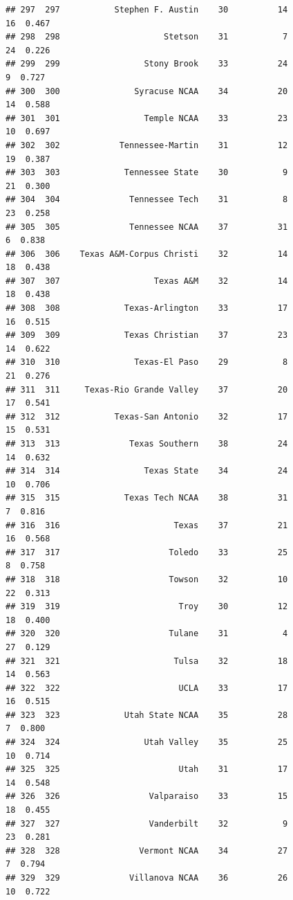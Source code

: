 \documentclass[]{book}
\begin{document}
\begin{verbatim}
## 297  297           Stephen F. Austin    30          14            16  0.467
## 298  298                     Stetson    31           7            24  0.226
## 299  299                 Stony Brook    33          24             9  0.727
## 300  300               Syracuse NCAA    34          20            14  0.588
## 301  301                 Temple NCAA    33          23            10  0.697
## 302  302            Tennessee-Martin    31          12            19  0.387
## 303  303             Tennessee State    30           9            21  0.300
## 304  304              Tennessee Tech    31           8            23  0.258
## 305  305              Tennessee NCAA    37          31             6  0.838
## 306  306    Texas A&M-Corpus Christi    32          14            18  0.438
## 307  307                   Texas A&M    32          14            18  0.438
## 308  308             Texas-Arlington    33          17            16  0.515
## 309  309             Texas Christian    37          23            14  0.622
## 310  310               Texas-El Paso    29           8            21  0.276
## 311  311     Texas-Rio Grande Valley    37          20            17  0.541
## 312  312           Texas-San Antonio    32          17            15  0.531
## 313  313              Texas Southern    38          24            14  0.632
## 314  314                 Texas State    34          24            10  0.706
## 315  315             Texas Tech NCAA    38          31             7  0.816
## 316  316                       Texas    37          21            16  0.568
## 317  317                      Toledo    33          25             8  0.758
## 318  318                      Towson    32          10            22  0.313
## 319  319                        Troy    30          12            18  0.400
## 320  320                      Tulane    31           4            27  0.129
## 321  321                       Tulsa    32          18            14  0.563
## 322  322                        UCLA    33          17            16  0.515
## 323  323             Utah State NCAA    35          28             7  0.800
## 324  324                 Utah Valley    35          25            10  0.714
## 325  325                        Utah    31          17            14  0.548
## 326  326                  Valparaiso    33          15            18  0.455
## 327  327                  Vanderbilt    32           9            23  0.281
## 328  328                Vermont NCAA    34          27             7  0.794
## 329  329              Villanova NCAA    36          26            10  0.722

\end{verbatim}
\end{document}
